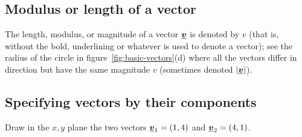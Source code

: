 \subsection*{Modulus or length of a vector}
The length, modulus, or magnitude of a vector $\mathit{\underline{\boldsymbol{v}}}$ is denoted by $v$ (that is, without the bold, underlining or whatever is used to denote a vector); see the radius of the circle in figure~\ref{fig:basic-vectors}(d) where all the vectors differ in direction but have the same magnitude $v$ (sometimes denoted $|\mathit{\underline{\boldsymbol{v}}}|$).

\subsection*{Specifying vectors by their components}
Draw in the $x,y$ plane the two vectors $\mathit{\underline{\boldsymbol{v}}}_1 = (1,4)$ and $\mathit{\underline{\boldsymbol{v}}}_2 = (4,1)$.



